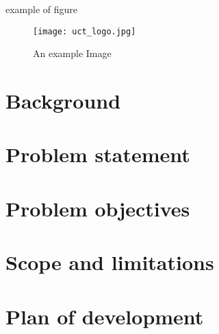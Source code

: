 example of figure
\begin{figure}[h]
\centering
\texttt{[image: uct\_logo.jpg]}
\caption{An example Image}
\label{fig:x cubed graph}
\end{figure}


\section{Background}

\section{Problem statement}

\section{Problem objectives}

\section{Scope and limitations}

\section{Plan of development}